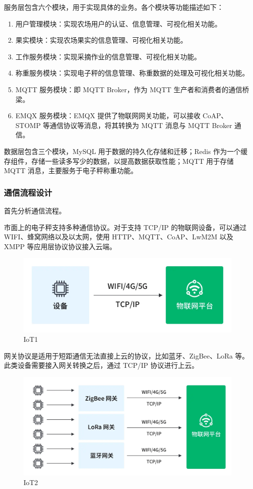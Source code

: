\documentclass{xduugmr}
\begin{document}
服务层包含六个模块，用于实现具体的业务。各个模块等功能描述如下：

\begin{enumerate}
    \item 用户管理模块：实现农场用户的认证、信息管理、可视化相关功能。
    \item 果实模块：实现农场果实的信息管理、可视化相关功能。
    \item 工作服务模块：实现采摘作业的信息管理、可视化相关功能。
    \item 称重服务模块：实现电子秤的信息管理、称重数据的处理及可视化相关功能。
    \item MQTT 服务模块：即 MQTT Broker，作为 MQTT 生产者和消费者的通信桥梁。
    \item EMQX 服务模块：EMQX 提供了物联网网关功能，可以接收 CoAP、STOMP 等通信协议等消息，将其转换为 MQTT 消息与 MQTT Broker 通信。
\end{enumerate}

数据层包含三个模块，MySQL 用于数据的持久化存储和迁移；Redis 作为一个缓存组件，存储一些读多写少的数据，以提高数据获取性能；MQTT 用于存储 MQTT 消息，主要服务于电子秤称重功能。

\subsubsection{通信流程设计}

首先分析通信流程。

市面上的电子秤支持多种通信协议。对于支持 TCP/IP 的物联网设备，可以通过 WIFI、蜂窝网络以及以太网，使用 HTTP、MQTT、CoAP、LwM2M 以及 XMPP 等应用层协议协议接入云端。

\begin{figure}[H]
    \centering
    \includegraphics[width=0.8\linewidth]{../design/IoT1.png}
    \caption{IoT1}
    \label{fig:IoT1}
\end{figure}

网关协议是适用于短距通信无法直接上云的协议，比如蓝牙、ZigBee、LoRa 等。此类设备需要接入网关转换之后，通过 TCP/IP 协议进行上云。

\begin{figure}[H]
    \centering
    \includegraphics[width=0.8\linewidth]{../design/IoT2.png}
    \caption{IoT2}
    \label{fig:IoT2}
\end{figure}
\end{document}
